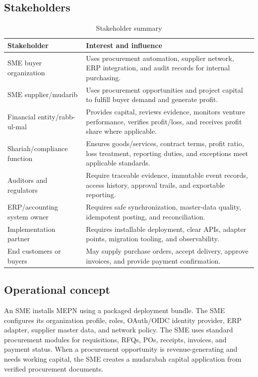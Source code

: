 \documentclass[11pt,a4paper]{article}
\newcommand{\systemshort}{MEPN}
\begin{document}
\subsection{Stakeholders}
\begin{table}[h]
\centering
\begin{tabularx}{\textwidth}{@{}p{}X@{}}
\toprule
Stakeholder & Interest and influence \\
\midrule
SME buyer organization & Uses procurement automation, supplier network, ERP integration, and audit records for internal purchasing. \\
SME supplier/mudarib & Uses procurement opportunities and project capital to fulfill buyer demand and generate profit. \\
Financial entity/rabb-ul-mal & Provides capital, reviews evidence, monitors venture performance, verifies profit/loss, and receives profit share where applicable. \\
Shariah/compliance function & Ensures goods/services, contract terms, profit ratio, loss treatment, reporting duties, and exceptions meet applicable standards. \\
Auditors and regulators & Require traceable evidence, immutable event records, access history, approval trails, and exportable reporting. \\
ERP/accounting system owner & Requires safe synchronization, master-data quality, idempotent posting, and reconciliation. \\
Implementation partner & Requires installable deployment, clear APIs, adapter points, migration tooling, and observability. \\
End customers or buyers & May supply purchase orders, accept delivery, approve invoices, and provide payment confirmation. \\
\bottomrule
\end{tabularx}
\caption{Stakeholder summary}
\end{table}

\subsection{Operational concept}
An SME installs \systemshort{} using a packaged deployment bundle. The SME configures its organization profile, roles, OAuth/OIDC identity provider, ERP adapter, supplier master data, and network policy. The SME uses standard procurement modules for requisitions, RFQs, POs, receipts, invoices, and payment status. When a procurement opportunity is revenue-generating and needs working capital, the SME creates a mudarabah capital application from verified procurement documents.
\end{document}
